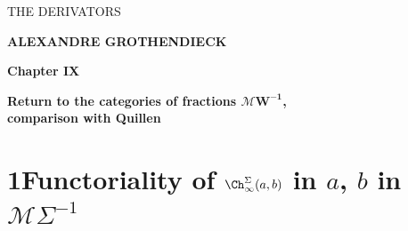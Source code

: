 
\begin{center}
{\LARGE\textsf{THE DERIVATORS}}

\bigskip

\textbf{ALEXANDRE GROTHENDIECK}

\bigskip\bigskip

\textbf{Chapter IX}

\textbf{Return to the categories of fractions $\boldsymbol{\mathcal{M}W^{-1}}$,\\
comparison with Quillen}
\end{center}

\clearpage



\clearpage



\section*{1\quad Functoriality of $\Ch^{\Sigma}_{\infty}(a,b)$ in $a$, $b$ in $\mathcal{M}\Sigma^{-1}$}

